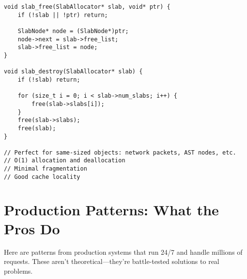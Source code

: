 \begin{lstlisting}
void slab_free(SlabAllocator* slab, void* ptr) {
    if (!slab || !ptr) return;

    SlabNode* node = (SlabNode*)ptr;
    node->next = slab->free_list;
    slab->free_list = node;
}

void slab_destroy(SlabAllocator* slab) {
    if (!slab) return;

    for (size_t i = 0; i < slab->num_slabs; i++) {
        free(slab->slabs[i]);
    }
    free(slab->slabs);
    free(slab);
}

// Perfect for same-sized objects: network packets, AST nodes, etc.
// O(1) allocation and deallocation
// Minimal fragmentation
// Good cache locality
\end{lstlisting}

\section{Production Patterns: What the Pros Do}

Here are patterns from production systems that run 24/7 and handle millions of requests. These aren't theoretical---they're battle-tested solutions to real problems.

